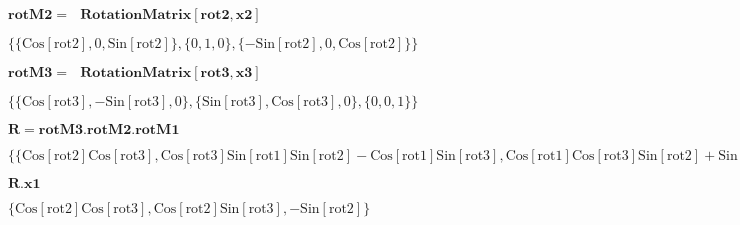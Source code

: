 \documentclass{article}
\begin{document}
\begin{doublespace}
\noindent\(\pmb{\text{rotM2} =\text{  }\text{RotationMatrix}[\text{rot2},\text{x2}]}\)
\end{doublespace}

\begin{doublespace}
\noindent\(\{\{\text{Cos}[\text{rot2}],0,\text{Sin}[\text{rot2}]\},\{0,1,0\},\{-\text{Sin}[\text{rot2}],0,\text{Cos}[\text{rot2}]\}\}\)
\end{doublespace}

\begin{doublespace}
\noindent\(\pmb{\text{rotM3} =\text{  }\text{RotationMatrix}[\text{rot3},\text{x3}]}\)
\end{doublespace}

\begin{doublespace}
\noindent\(\{\{\text{Cos}[\text{rot3}],-\text{Sin}[\text{rot3}],0\},\{\text{Sin}[\text{rot3}],\text{Cos}[\text{rot3}],0\},\{0,0,1\}\}\)
\end{doublespace}

\begin{doublespace}
\noindent\(\pmb{R=\text{rotM3}.\text{rotM2}.\text{rotM1}}\)
\end{doublespace}

\begin{doublespace}
\noindent\(\{\{\text{Cos}[\text{rot2}] \text{Cos}[\text{rot3}],\text{Cos}[\text{rot3}] \text{Sin}[\text{rot1}] \text{Sin}[\text{rot2}]-\text{Cos}[\text{rot1}]
\text{Sin}[\text{rot3}],\text{Cos}[\text{rot1}] \text{Cos}[\text{rot3}] \text{Sin}[\text{rot2}]+\text{Sin}[\text{rot1}] \text{Sin}[\text{rot3}]\},\{\text{Cos}[\text{rot2}]
\text{Sin}[\text{rot3}],\text{Cos}[\text{rot1}] \text{Cos}[\text{rot3}]+\text{Sin}[\text{rot1}] \text{Sin}[\text{rot2}] \text{Sin}[\text{rot3}],-\text{Cos}[\text{rot3}]
\text{Sin}[\text{rot1}]+\text{Cos}[\text{rot1}] \text{Sin}[\text{rot2}] \text{Sin}[\text{rot3}]\},\{-\text{Sin}[\text{rot2}],\text{Cos}[\text{rot2}]
\text{Sin}[\text{rot1}],\text{Cos}[\text{rot1}] \text{Cos}[\text{rot2}]\}\}\)
\end{doublespace}

\begin{doublespace}
\noindent\(\pmb{R.\text{x1}}\)
\end{doublespace}

\begin{doublespace}
\noindent\(\{\text{Cos}[\text{rot2}] \text{Cos}[\text{rot3}],\text{Cos}[\text{rot2}] \text{Sin}[\text{rot3}],-\text{Sin}[\text{rot2}]\}\)
\end{doublespace}
\end{document}
